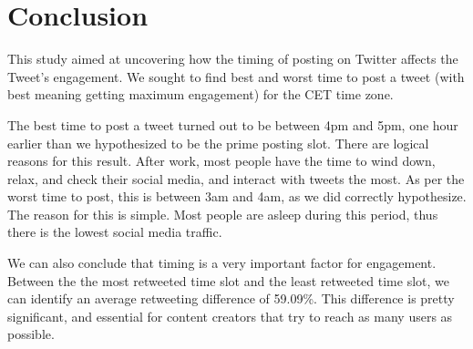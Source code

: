 \documentclass[11pt]{article}
\begin{document}
\section{Conclusion}
This study aimed at uncovering how the timing of posting on Twitter affects the Tweet's engagement. We sought to find best and worst time to post a tweet (with best meaning getting maximum engagement) for the CET time zone.

The best time to post a tweet turned out to be between 4pm and 5pm, one hour earlier than we hypothesized to be the prime posting slot. There are logical reasons for this result. After work, most people have the time to wind down, relax, and check their social media, and interact with tweets the most. As per the worst time to post, this is between 3am and 4am, as we did correctly hypothesize. The reason for this is simple. Most people are asleep during this period, thus there is the lowest social media traffic.

We can also conclude that timing is a very important factor for engagement. Between the the most retweeted time slot and the least retweeted time slot, we can identify an average retweeting difference of 59.09\%. This difference is pretty significant, and essential for content creators that try to reach as many users as possible.







\end{document}
